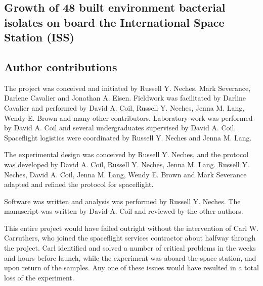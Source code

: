 \begin{refsection}

\chapter{Growth of 48 built environment bacterial isolates on board the International Space Station (ISS)}


\section{Author contributions}

The project was conceived and initiated by Russell Y. Neches, Mark
Severance, Darlene Cavalier and Jonathan A. Eisen. Fieldwork was
facilitated by Darline Cavalier and performed by David A. Coil,
Russell Y. Neches, Jenna M. Lang, Wendy E. Brown and many other
contributors. Laboratory work was performed by David A. Coil and
several undergraduates supervised by David A. Coil. Spaceflight
logistics were coordinated by Russell Y. Neches and Jenna M. Lang.

The experimental design was conceived by Russell Y. Neches, and the
protocol was developed by David A. Coil, Russell Y. Neches, Jenna M.
Lang. Russell Y. Neches, David A. Coil, Jenna M. Lang, Wendy E. Brown
and Mark Severance adapted and refined the protocol for spaceflight.

Software was written and analysis was performed by Russell Y. Neches.
The manuscript was written by David A. Coil and reviewed by the
other authors.

This entire project would have failed outright without the
intervention of Carl W. Carruthers, who joined the spaceflight
services contractor about halfway through the project. Carl identified
and solved a number of critical problems in the weeks and hours before
launch, while the experiment was aboard the space station, and upon
return of the samples. Any one of these issues would have resulted in
a total loss of the experiment.







\printbibliography[heading=subbibliography]

\end{refsection}
